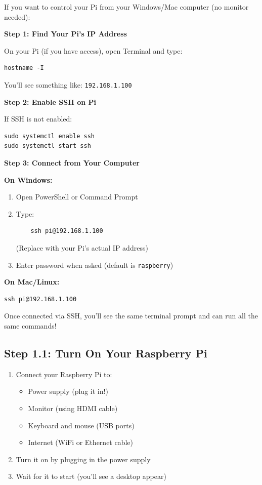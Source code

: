 \documentclass[12pt,a4paper]{article}
\begin{document}
If you want to control your Pi from your Windows/Mac computer (no monitor needed):

\textbf{Step 1: Find Your Pi's IP Address}

On your Pi (if you have access), open Terminal and type:
\begin{lstlisting}
hostname -I
\end{lstlisting}

You'll see something like: \texttt{192.168.1.100}

\textbf{Step 2: Enable SSH on Pi}

If SSH is not enabled:
\begin{lstlisting}
sudo systemctl enable ssh
sudo systemctl start ssh
\end{lstlisting}

\textbf{Step 3: Connect from Your Computer}

\textbf{On Windows:}
\begin{enumerate}
    \item Open PowerShell or Command Prompt
    \item Type:
    \begin{lstlisting}
    ssh pi@192.168.1.100
    \end{lstlisting}
    (Replace with your Pi's actual IP address)
    \item Enter password when asked (default is \texttt{raspberry})
\end{enumerate}

\textbf{On Mac/Linux:}
\begin{lstlisting}
ssh pi@192.168.1.100
\end{lstlisting}

\begin{tipbox}
Once connected via SSH, you'll see the same terminal prompt and can run all the same commands!
\end{tipbox}

\subsection{Step 1.1: Turn On Your Raspberry Pi}

\begin{enumerate}
    \item Connect your Raspberry Pi to:
    \begin{itemize}
        \item Power supply (plug it in!)
        \item Monitor (using HDMI cable)
        \item Keyboard and mouse (USB ports)
        \item Internet (WiFi or Ethernet cable)
    \end{itemize}
    
    \item Turn it on by plugging in the power supply
    \item Wait for it to start (you'll see a desktop appear)
\end{enumerate}
\end{document}
